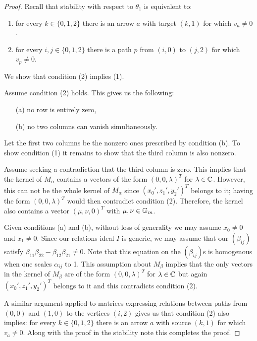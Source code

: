 \documentclass{amsart}
\theoremstyle{definition}
\begin{document}
\begin{proof}
Recall that stability with respect to $\theta_1$ is equivalent to:
\begin{enumerate}
    \item for every $k \in \{0,1,2\}$ there is an arrow $a$ with target $(k,1)$ for which $v_a \neq 0$. 
    \item for every $i,j \in \{0,1,2\}$ there is a path $p$ from $(i,0)$ to $(j,2)$ for which $v_p\neq 0$.
\end{enumerate}
We show that condition (2) implies (1).

Assume condition (2) holds.
This gives us the following:
\begin{enumerate}
    \item[(a)] no row is entirely zero,
    \item[(b)] no two columns can vanish simultaneously.
\end{enumerate}
Let the first two columns be the nonzero ones prescribed by condition (b).
To show condition (1) it remains to show that the third column is also nonzero.

Assume seeking a contradiction that the third column is zero.
This implies that the kernel of $M_\alpha$ contains a vectors of the form $(0,0,\lambda)^T$ for $\lambda \in \mathbb{C}$.
However, this can not be the whole kernel of $M_\alpha$ since $(x_0',z_1',y_2')^T$ belongs to it; having the form $(0,0,\lambda)^T$ would then contradict condition (2).
Therefore, the kernel also contains a vector $(\mu, \nu, 0)^T$ with $\mu, \nu \in \mathbb{G}_m$. 

Given conditions (a) and (b), without loss of generality we may assume $x_0 \neq 0$ and $x_1 \neq 0$.
Since our relations ideal $I$ is generic, we may assume that our $(\beta_{ij})$ satisfy $\beta_{11}\beta_{22}- \beta_{12}\beta_{21} \neq 0$.
Note that this equation on the $(\beta_{ij})$s is homogenous when one scales $\alpha_{ij}$ to 1.
This assumption about $M_\beta$ implies that the only vectors in the kernel of $M_\beta$ are of the form $(0,0,\lambda)^T$ for $\lambda \in \mathbb{C}$ but again $(x_0',z_1',y_2')^T$ belongs to it and this contradicts condition (2).

A similar argument applied to matrices expressing relations between paths from $(0,0)$ and $(1,0)$ to the vertices $(i,2)$ gives us that condition (2) also implies: for every $k \in \{0,1,2\}$ there is an arrow $a$ with source $(k,1)$ for which $v_a \neq 0$.
Along with the proof in the stability note this completes the proof.
\end{proof}
\end{document}
